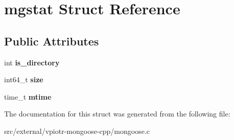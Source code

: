 \hypertarget{structmgstat}{\section{mgstat Struct Reference}
\label{structmgstat}
}
\subsection*{Public Attributes}
\begin{DoxyCompactItemize}
\item 
\hypertarget{structmgstat_aba4026da49a23f5535503be8f367da71}{int {\bfseries is\-\_\-directory}}\label{structmgstat_aba4026da49a23f5535503be8f367da71}

\item 
\hypertarget{structmgstat_a2ae73c69489e86d38793f591f406d86b}{int64\-\_\-t {\bfseries size}}\label{structmgstat_a2ae73c69489e86d38793f591f406d86b}

\item 
\hypertarget{structmgstat_a1b35e1ab69603e81c28de2dd3b3f0c5a}{time\-\_\-t {\bfseries mtime}}\label{structmgstat_a1b35e1ab69603e81c28de2dd3b3f0c5a}

\end{DoxyCompactItemize}


The documentation for this struct was generated from the following file\-:\begin{DoxyCompactItemize}
\item 
src/external/vpiotr-\/mongoose-\/cpp/mongoose.\-c\end{DoxyCompactItemize}
